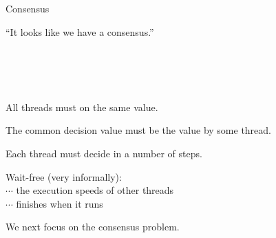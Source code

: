 \begin{frame}{}
  \centerline{\LARGE Consensus}

  \vspace{0.50cm}

  \vspace{-0.30cm} 
  \centerline{``It looks like we have a consensus.''}　
\end{frame}

\begin{frame}{}
  \begin{columns}
      \centerline{\qquad\qquad \large \bf {}}
      \centerline{\large \bf {}\qquad\qquad}
  \end{columns}

  \pause
  \vspace{0.80cm}
  \begin{definition}
    \begin{description}
      \setlength{\itemsep}{5pt}
      \item[Agreement] All  threads must  on the same value.
      \item[Validity] The common decision value must be the value  by some thread.
      \item[Wait-free] Each  thread must decide in a  number of steps.
    \end{description}
  \end{definition}
\end{frame}

\begin{frame}{}

  \vspace{0.20cm}
  \begin{center}
    Wait-free {\footnotesize (very informally)}: \\[6pt]

    $\cdots$  the execution speeds of other threads \pause \\[8pt]

    $\cdots$  finishes when it runs 
  \end{center}
\end{frame}

\begin{frame}{}
  
  \centerline{\Large We next focus on the  consensus problem.}
\end{frame}
